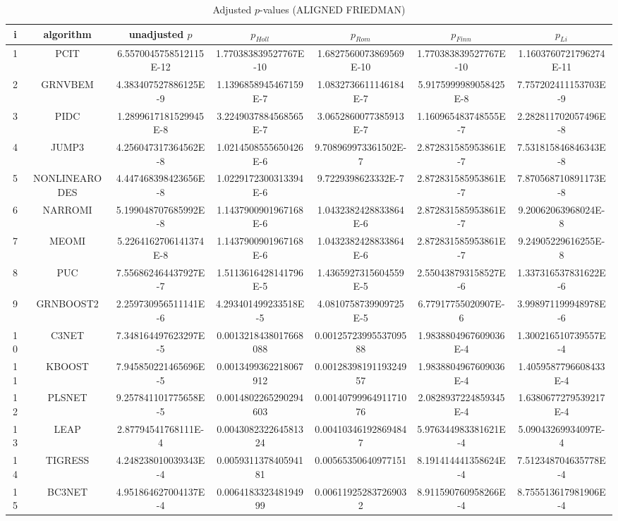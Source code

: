 \documentclass[a4paper,10pt]{article}
\begin{document}
\begin{landscape}
\begin{table}[!htp]
\centering\scriptsize
\caption{Adjusted $p$-values (ALIGNED FRIEDMAN)}
\begin{tabular}{ccccccc}
i&algorithm&unadjusted $p$&$p_{Holl}$&$p_{Rom}$&$p_{Finn}$&$p_{Li}$\\
\hline
1&PCIT&6.5570045758512115E-12&1.770383839527767E-10&1.6827560073869569E-10&1.770383839527767E-10&1.1603760721796274E-11\\
2&GRNVBEM&4.383407527886125E-9&1.1396858945467159E-7&1.0832736611146184E-7&5.9175999989058425E-8&7.757202411153703E-9\\
3&PIDC&1.2899617181529945E-8&3.2249037884568565E-7&3.0652860077385913E-7&1.160965483748555E-7&2.282811702057496E-8\\
4&JUMP3&4.256047317364562E-8&1.0214508555650426E-6&9.708969973361502E-7&2.872831585953861E-7&7.531815846846343E-8\\
5&NONLINEARODES&4.447468398423656E-8&1.0229172300313394E-6&9.7229398623332E-7&2.872831585953861E-7&7.870568710891173E-8\\
6&NARROMI&5.199048707685992E-8&1.1437900901967168E-6&1.0432382428833864E-6&2.872831585953861E-7&9.20062063968024E-8\\
7&MEOMI&5.2264162706141374E-8&1.1437900901967168E-6&1.0432382428833864E-6&2.872831585953861E-7&9.24905229616255E-8\\
8&PUC&7.556862464437927E-7&1.5113616428141796E-5&1.4365927315604559E-5&2.550438793158527E-6&1.337316537831622E-6\\
9&GRNBOOST2&2.259730956511141E-6&4.293401499233518E-5&4.0810758739909725E-5&6.77917755020907E-6&3.998971199948978E-6\\
10&C3NET&7.348164497623297E-5&0.0013218438017668088&0.0012572399553709588&1.9838804967609036E-4&1.300216510739557E-4\\
11&KBOOST&7.945850221465696E-5&0.0013499362218067912&0.0012839819119324957&1.9838804967609036E-4&1.4059587796608433E-4\\
12&PLSNET&9.257841101775658E-5&0.0014802265290294603&0.0014079996491171076&2.0828937224859345E-4&1.6380677279539217E-4\\
13&LEAP&2.87794541768111E-4&0.004308232264581324&0.004103461928694847&5.976344983381621E-4&5.09043269934097E-4\\
14&TIGRESS&4.248238010039343E-4&0.005931137840594181&0.00565350640977151&8.191414441358624E-4&7.512348704635778E-4\\
15&BC3NET&4.951864627004137E-4&0.006418332348194999&0.006119252837269032&8.911590760958266E-4&8.755513617981906E-4\\

\end{tabular}
\end{table}
\end{landscape}
\end{document}
